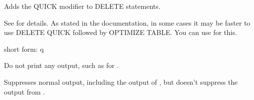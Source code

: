\documentclass[letterpaper,10pt,english]{sphinxmanual}
\begin{document}
\begin{fulllineitems}
\label{\detokenize{mariadb-archiver:cmdoption-mariadb-archiver-quick-delete}}
\sphinxAtStartPar
Adds the QUICK modifier to DELETE statements.

\sphinxAtStartPar
See  for details.  As stated in the
documentation, in some cases it may be faster to use DELETE QUICK followed by
OPTIMIZE TABLE.  You can use {\hyperref[\detokenize{mariadb-archiver:cmdoption-mariadb-archiver-optimize}]{}} for this.

\end{fulllineitems}


\begin{fulllineitems}
\label{\detokenize{mariadb-archiver:cmdoption-mariadb-archiver-quiet}}
\sphinxAtStartPar
short form: \sphinxhyphen{}q

\sphinxAtStartPar
Do not print any output, such as for {\hyperref[\detokenize{mariadb-archiver:cmdoption-mariadb-archiver-statistics}]{}}.

\sphinxAtStartPar
Suppresses normal output, including the output of {\hyperref[\detokenize{mariadb-archiver:cmdoption-mariadb-archiver-statistics}]{}}, but doesn’t
suppress the output from {\hyperref[\detokenize{mariadb-archiver:cmdoption-mariadb-archiver-why-quit}]{}}.

\end{fulllineitems}

\end{document}
